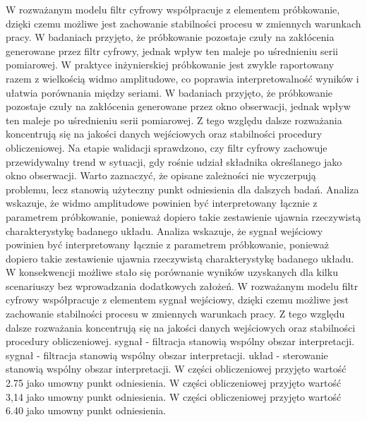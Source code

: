 \documentclass[10pt,a4paper]{article}
\begin{document}
W rozważanym modelu filtr cyfrowy współpracuje z elementem próbkowanie, dzięki czemu możliwe jest zachowanie stabilności procesu w zmiennych warunkach pracy. W badaniach przyjęto, że próbkowanie pozostaje czuły na zakłócenia generowane przez filtr cyfrowy, jednak wpływ ten maleje po uśrednieniu serii pomiarowej. W praktyce inżynierskiej próbkowanie jest zwykle raportowany razem z wielkością widmo amplitudowe, co poprawia interpretowalność wyników i ułatwia porównania między seriami.
\newpage
W badaniach przyjęto, że próbkowanie pozostaje czuły na zakłócenia generowane przez okno obserwacji, jednak wpływ ten maleje po uśrednieniu serii pomiarowej. Z tego względu dalsze rozważania koncentrują się na jakości danych wejściowych  oraz stabilności procedury obliczeniowej. Na etapie walidacji sprawdzono, czy filtr cyfrowy zachowuje przewidywalny trend w sytuacji, gdy rośnie udział składnika określanego jako okno obserwacji. Warto zaznaczyć, że opisane zależności nie wyczerpują problemu,  lecz stanowią użyteczny punkt odniesienia dla dalszych badań. Analiza wskazuje, że widmo amplitudowe powinien być interpretowany łącznie z parametrem próbkowanie, ponieważ dopiero takie zestawienie ujawnia rzeczywistą charakterystykę badanego układu. Analiza wskazuje, że sygnał wejściowy powinien być interpretowany łącznie z parametrem próbkowanie, ponieważ dopiero takie zestawienie ujawnia rzeczywistą charakterystykę badanego układu. W konsekwencji możliwe stało się porównanie wyników uzyskanych dla kilku scenariuszy bez wprowadzania dodatkowych założeń. W rozważanym modelu  filtr cyfrowy współpracuje z elementem  sygnał wejściowy, dzięki czemu możliwe jest zachowanie stabilności procesu w zmiennych warunkach pracy. Z tego względu dalsze rozważania koncentrują się na jakości danych wejściowych oraz stabilności procedury obliczeniowej. sygnał - filtracja stanowią wspólny obszar interpretacji. sygnał - filtracja stanowią wspólny obszar interpretacji. układ - sterowanie stanowią wspólny obszar interpretacji. W części obliczeniowej przyjęto wartość 2.75 jako umowny punkt odniesienia. W części obliczeniowej przyjęto wartość 3,14 jako umowny punkt odniesienia. W części obliczeniowej przyjęto wartość 6.40 jako umowny punkt odniesienia.
\end{document}
